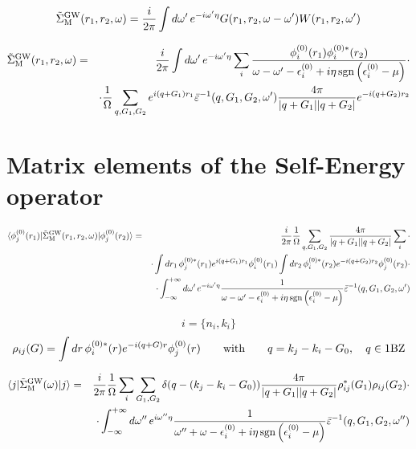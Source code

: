 \documentclass[fleqn]{article}
\begin{document}
\[
  \tilde{\Sigma}^{\rm GW}_{\rm M}(r_1,r_2,\omega) =
  \frac{i}{2 \pi} \int d\omega' \, e^{-i \omega' \eta}
  G(r_1,r_2,\omega-\omega')
  W(r_1,r_2,\omega')
\]

\begin{eqnarray*}
  \tilde{\Sigma}^{\rm GW}_{\rm M}(r_1,r_2,\omega) &=&
  \frac{i}{2 \pi} \int d\omega' \, e^{-i \omega' \eta}
  \sum_i \frac{\phi^{(0)}_i(r_1) \phi^{(0)*}_i(r_2)}
  {\omega - \omega' - \epsilon^{(0)}_i + i \eta \mathrm{\, sgn} \left( \epsilon^{(0)}_i - \mu \right)} \cdot \\
  && \cdot \frac{1}{\Omega} \sum_{q,G_1,G_2}
  e^{i (q+G_1) r_1} \bar{\varepsilon}^{-1}(q,G_1,G_2,\omega')
  \frac{4\pi}{|q+G_1||q+G_2|} e^{-i (q+G_2) r_2}
\end{eqnarray*}

\section{Matrix elements of the Self-Energy operator}

\begin{eqnarray*}
\langle \phi^{(0)}_j(r_1) | \tilde{\Sigma}^{\rm GW}_{\rm M}(r_1,r_2,\omega) | \phi^{(0)}_j(r_2) \rangle
&=&  \frac{i}{2 \pi} \frac{1}{\Omega} \sum_{q,G_1,G_2}
   \frac{4\pi}{|q+G_1||q+G_2|} \sum_i \cdot \\ && \cdot
  \int dr_1 \, \phi^{(0)*}_j(r_1) e^{i (q+G_1) r_1} \phi^{(0)}_i(r_1)
  \int dr_2  \, \phi^{(0)*}_i(r_2) e^{-i (q+G_2) r_2} \phi^{(0)}_j(r_2) \cdot \\ && \cdot
  \int_{-\infty}^{+\infty} d\omega' \, e^{-i \omega' \eta}
   \frac{1}{\omega - \omega' - \epsilon^{(0)}_i + i \eta \mathrm{\, sgn} \left( \epsilon^{(0)}_i - \mu \right)}
  \bar{\varepsilon}^{-1}(q,G_1,G_2,\omega')
\end{eqnarray*}

\[
i = \{n_i,k_i\}
\]
\[
\rho_{ij}(G) = \int dr  \, \phi^{(0)*}_i(r) e^{-i (q+G) r} \phi^{(0)}_j(r)
\qquad \textrm{with} \qquad q = k_j - k_i - G_0, \quad q \in {\rm 1BZ}
\]

\begin{eqnarray*}
\langle j | \tilde{\Sigma}^{\rm GW}_{\rm M}(\omega) | j \rangle
&=&  \frac{i}{2 \pi} \frac{1}{\Omega} \sum_i \sum_{G_1,G_2} \delta(q-(k_j - k_i - G_0))
   \frac{4\pi}{|q+G_1||q+G_2|}
  \rho^*_{ij}(G_1) \rho_{ij}(G_2)  \cdot \\ && \cdot
  \int_{-\infty}^{+\infty} d\omega'' \, e^{i \omega'' \eta}
   \frac{1}{\omega'' + \omega - \epsilon^{(0)}_i + i \eta \mathrm{\, sgn} \left( \epsilon^{(0)}_i - \mu \right)}
  \bar{\varepsilon}^{-1}(q,G_1,G_2,\omega'')
\end{eqnarray*}
\end{document}
